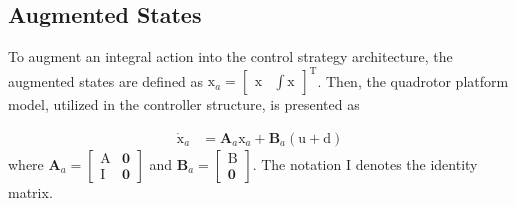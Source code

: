 \documentclass[3p]{elsarticle}
\begin{document}
\subsection{Augmented States}
\noindent To augment an integral action into the control strategy architecture, the augmented states are defined as $\boldsymbol{\mathrm{x}}_{a} = \begin{bmatrix}
    \boldsymbol{\mathrm{x}} &
    \displaystyle\int\boldsymbol{\mathrm{x}}
\end{bmatrix}^\mathrm{T}$. Then, the quadrotor platform model, utilized in the controller structure, is presented as

\begin{equation}\label{systemlqidg}
    \begin{split}
        \boldsymbol{\dot{\mathrm{x}}}_a &= \mathbf{A}_a \boldsymbol{\mathrm{x}}_a + \mathbf{B}_a
         \left(\boldsymbol{\mathrm{u}} + \boldsymbol{\mathrm{d}}\right)%
    \end{split}
\end{equation}
where $\mathbf{A}_a = \begin{bmatrix}
\boldsymbol{\mathrm{A}} & \boldsymbol{0}\\
\boldsymbol{\mathrm{I}} & \boldsymbol{0}
\end{bmatrix}$ and $\mathbf{B}_a=\begin{bmatrix}
    \boldsymbol{\mathrm{B}}\\
    \boldsymbol{0}
\end{bmatrix}$.
The notation $\boldsymbol{\mathrm{I}}$ denotes the identity matrix.
\end{document}

